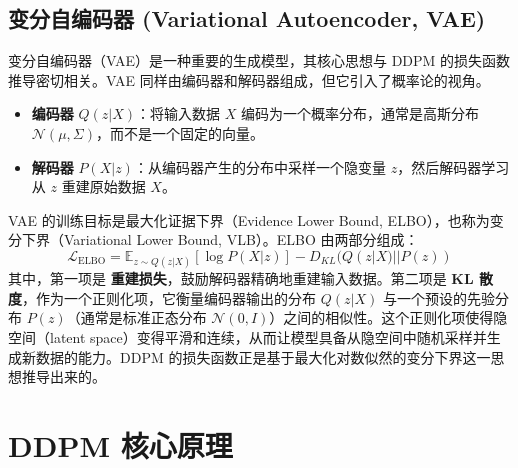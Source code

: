 \documentclass{ctexart}
\begin{document}
\subsection{变分自编码器 (Variational Autoencoder, VAE)}
\noindent
变分自编码器（VAE）是一种重要的生成模型，其核心思想与 DDPM 的损失函数推导密切相关。VAE 同样由编码器和解码器组成，但它引入了概率论的视角。
\begin{itemize}
    \item \textbf{编码器} $Q(z|X)$：将输入数据 $X$ 编码为一个概率分布，通常是高斯分布 $\mathcal{N}(\mu, \Sigma)$，而不是一个固定的向量。
    \item \textbf{解码器} $P(X|z)$：从编码器产生的分布中采样一个隐变量 $z$，然后解码器学习从 $z$ 重建原始数据 $X$。
\end{itemize}
\noindent
VAE 的训练目标是最大化证据下界（Evidence Lower Bound, ELBO），也称为变分下界（Variational Lower Bound, VLB）。ELBO 由两部分组成：
$$ \mathcal{L}_{\text{ELBO}} = \mathbb{E}_{z \sim Q(z|X)}[\log P(X|z)] - D_{KL}(Q(z|X) || P(z)) $$
其中，第一项是 \textbf{重建损失}，鼓励解码器精确地重建输入数据。第二项是 \textbf{KL 散度}，作为一个正则化项，它衡量编码器输出的分布 $Q(z|X)$ 与一个预设的先验分布 $P(z)$（通常是标准正态分布 $\mathcal{N}(0, I)$）之间的相似性。这个正则化项使得隐空间（latent space）变得平滑和连续，从而让模型具备从隐空间中随机采样并生成新数据的能力。DDPM 的损失函数正是基于最大化对数似然的变分下界这一思想推导出来的。

\section{DDPM 核心原理}
\end{document}
